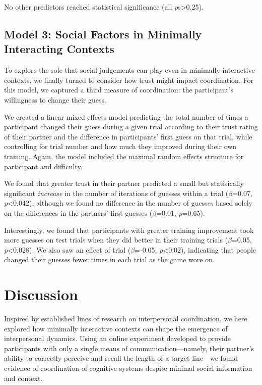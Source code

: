 \documentclass[10pt, letterpaper]{article}
\begin{document}
No other predictors reached statistical significance (all
\emph{p}s\textgreater{}0.25).

\subsection{Model 3: Social Factors in Minimally Interacting
Contexts}\label{model-3-social-factors-in-minimally-interacting-contexts}

To explore the role that social judgements can play even in minimally
interactive contexts, we finally turned to consider how trust might
impact coordination. For this model, we captured a third measure of
coordination: the participant's willingness to change their guess.

We created a linear-mixed effects model predicting the total number of
times a participant changed their guess during a given trial according
to their trust rating of their partner and the difference in
participants' first guess on that trial, while controlling for trial
number and how much they improved during their own training. Again, the
model included the maximal random effects structure for participant and
difficulty.

We found that greater trust in their partner predicted a small but
statisically significant \emph{increase} in the number of iterations of
guesses within a trial (\emph{\(\beta\)}=0.07,
\emph{p}\textless{}0.042), although we found no difference in the number
of guesses based solely on the differences in the partners' first
guesses (\emph{\(\beta\)}=0.01, \emph{p}=0.65).

Interestingly, we found that participants with greater training
improvement took more guesses on test trials when they did better in
their training trials (\emph{\(\beta\)}=0.05, \emph{p}\textless{}0.028).
We also saw an effect of trial (\emph{\(\beta\)}=-0.05,
\emph{p}\textless{}0.02), indicating that people changed their guesses
fewer times in each trial as the game wore on.

\section{Discussion}\label{discussion}

Inspired by established lines of research on interpersonal coordination,
we here explored how minimally interactive contexts can shape the
emergence of interpersonal dynamics. Using an online experiment
developed to provide participants with only a single means of
communication---namely, their partner's ability to correctly perceive
and recall the length of a target line---we found evidence of
coordination of cognitive systems despite minimal social information and
context.
\end{document}
